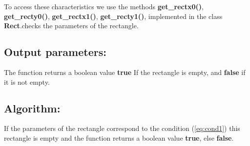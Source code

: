 \documentclass{report}
\begin{document}
To access these characteristics we use the methods  {\bfseries get\_rectx0()}, {\bfseries get\_recty0()}, {\bfseries get\_rectx1()}, {\bfseries get\_recty1()}, implemented in the class {\bfseries Rect}.checks the parameters  of the rectangle.

\subsection*{Output parameters:}

The function returns a boolean value {\bfseries true} If the rectangle is empty, and {\bfseries false} if it is not empty.

\subsection*{Algorithm:}

If the parameters of the rectangle correspond to the condition (\ref{eq:cond1}) this rectangle is empty and the function returns a boolean value {\bfseries true}, else  {\bfseries false}. 
\end{document}
